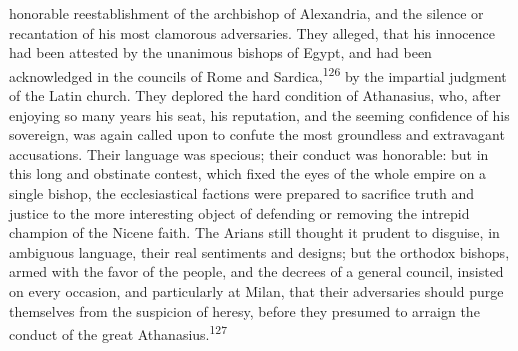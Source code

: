 honorable reestablishment of the archbishop of Alexandria, and
the silence or recantation of his most clamorous adversaries.
They alleged, that his innocence had been attested by the
unanimous bishops of Egypt, and had been acknowledged in the
councils of Rome and Sardica,\textsuperscript{126} by the impartial judgment of
the Latin church. They deplored the hard condition of Athanasius,
who, after enjoying so many years his seat, his reputation, and
the seeming confidence of his sovereign, was again called upon to
confute the most groundless and extravagant accusations. Their
language was specious; their conduct was honorable: but in this
long and obstinate contest, which fixed the eyes of the whole
empire on a single bishop, the ecclesiastical factions were
prepared to sacrifice truth and justice to the more interesting
object of defending or removing the intrepid champion of the
Nicene faith. The Arians still thought it prudent to disguise, in
ambiguous language, their real sentiments and designs; but the
orthodox bishops, armed with the favor of the people, and the
decrees of a general council, insisted on every occasion, and
particularly at Milan, that their adversaries should purge
themselves from the suspicion of heresy, before they presumed to
arraign the conduct of the great Athanasius.\textsuperscript{127}




